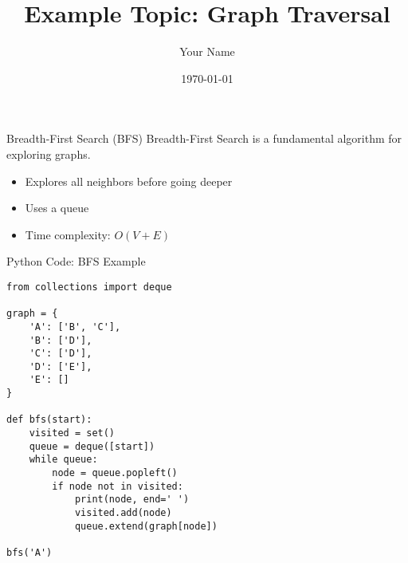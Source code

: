 \documentclass{beamer}
\title{Example Topic: Graph Traversal}
\author{Your Name}
\institute{Discrete Mathematics II, 2025S}
\date{\today}
\begin{document}
\begin{frame}
  \titlepage
\end{frame}

\begin{frame}{Breadth-First Search (BFS)}
Breadth-First Search is a fundamental algorithm for exploring graphs.

\begin{itemize}
  \item Explores all neighbors before going deeper
  \item Uses a queue
  \item Time complexity: \(O(V + E)\)
\end{itemize}

\vspace{0.5cm}
\begin{center}
\end{center}
\end{frame}

\begin{frame}[fragile]{Python Code: BFS Example}
\begin{verbatim}
from collections import deque

graph = {
    'A': ['B', 'C'],
    'B': ['D'],
    'C': ['D'],
    'D': ['E'],
    'E': []
}

def bfs(start):
    visited = set()
    queue = deque([start])
    while queue:
        node = queue.popleft()
        if node not in visited:
            print(node, end=' ')
            visited.add(node)
            queue.extend(graph[node])

bfs('A')
\end{verbatim}
\end{frame}
\end{document}
